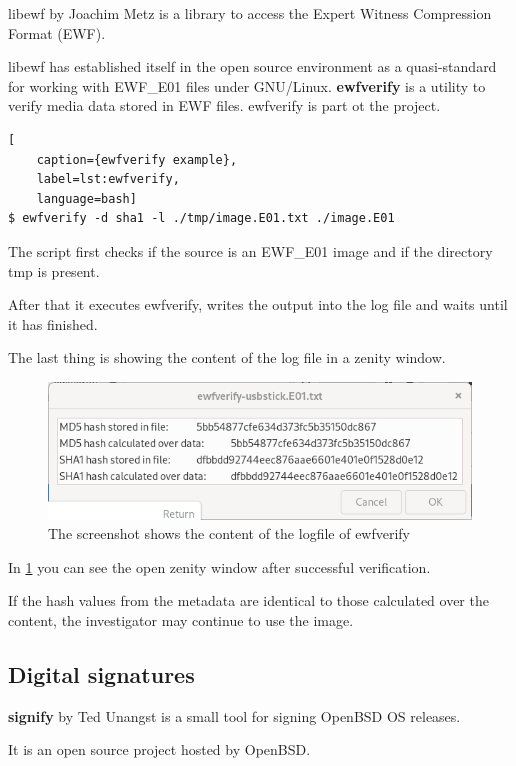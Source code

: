 libewf \cite{Libewf} by Joachim Metz is a library to access the Expert Witness Compression Format (EWF).

libewf has established itself in the open source environment as a quasi-standard for working with EWF\_E01 files under GNU/Linux.\newline
\newline
\noindent \textbf{ewfverify} is a utility to verify media data stored in EWF files. ewfverify is part ot the project.

\begin{lstlisting}[
    caption={ewfverify example},
    label=lst:ewfverify,
    language=bash]
$ ewfverify -d sha1 -l ./tmp/image.E01.txt ./image.E01
\end{lstlisting}

\noindent The script first checks if the source is an EWF\_E01 image and if the directory tmp is present.

After that it executes ewfverify, writes the output into the log file and waits until it has finished.

The last thing is showing the content of the log file in a zenity window.

\begin{figure}[htbp]  %
  \centering
  \includegraphics[width=.5\textwidth]{figures/ewfverify.png}
  \caption[ewfverify logfile]{The screenshot shows the content of the logfile of ewfverify}
  \label{fig:ewfverifylog}
\end{figure}

In \cref{fig:ewfverifylog} you can see the open zenity window after successful verification.

If the hash values from the metadata are identical to those calculated over the content, the investigator may continue to use the image.

\subsection{Digital signatures}

\textbf{signify} by Ted Unangst is a small tool for signing OpenBSD OS releases.

It is an open source project \cite{SignifyCSV} hosted by OpenBSD.

